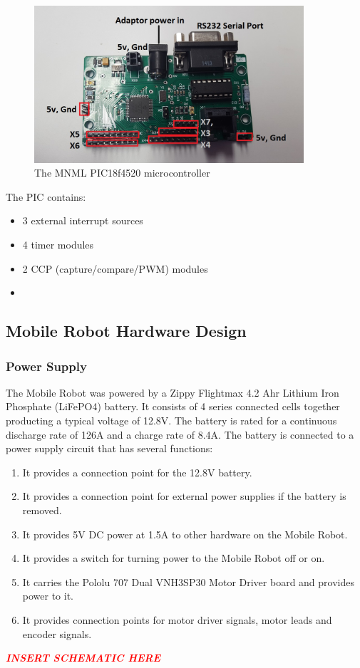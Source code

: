 \documentclass[11pt,a4paper]{article}
\begin{document}
    \begin{figure}[h]
        \includegraphics[width = 10cm]{pic.png}
        \caption{The MNML PIC18f4520 microcontroller}
    \end{figure}
    The PIC contains:
    \begin{itemize}
      \item 3 external interrupt sources
      \item 4 timer modules
      \item 2 CCP (capture/compare/PWM) modules
      \item
    \end{itemize}

  \subsection{Mobile Robot Hardware Design}
    \subsubsection{Power Supply}
      The Mobile Robot was powered by a Zippy Flightmax 4.2 Ahr Lithium Iron Phosphate (LiFePO4) battery. It consists of 4 series connected cells together producting a typical voltage of 12.8V. The battery is rated for a continuous discharge rate of 126A and a charge rate of 8.4A. The battery is connected to a power supply circuit that has several functions:
      \begin{enumerate}
        \item It provides a connection point for the 12.8V battery.
        \item It provides a connection point for external power supplies if the battery is removed.
        \item It provides 5V DC power at 1.5A to other hardware on the Mobile Robot.
        \item It provides a switch for turning power to the Mobile Robot off or on.
        \item It carries the Pololu 707 Dual VNH3SP30 Motor Driver board and provides power to it.
        \item It provides connection points for motor driver signals, motor leads and encoder signals.
      \end{enumerate}
      \textcolor{red}
      {
      \textit{\textbf{INSERT SCHEMATIC HERE}}
      }
\end{document}
